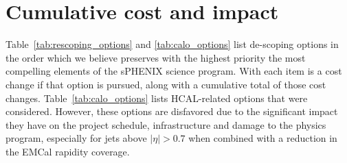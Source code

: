 
\section{Cumulative cost and impact}
\label{sec:cumul-cost-impact}

Table~\ref{tab:rescoping_options} and \ref{tab:calo_options} list de-scoping options in the order which we
believe preserves with the highest priority the most compelling
elements of the sPHENIX science program.  With each item is a cost
change if that option is pursued, along with a cumulative total of
those cost changes. Table~\ref{tab:calo_options} lists HCAL-related options that were considered. 
However, these options are disfavored due to the significant 
impact they have on the project schedule, infrastructure and damage to the 
physics program, especially for jets above $|\eta| > 0.7$ when combined with a reduction in the EMCal rapidity coverage.

